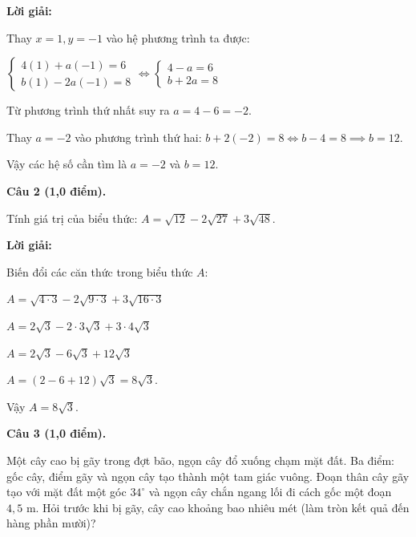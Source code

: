 \documentclass[12pt,a4paper]{article}
\begin{document}
\noindent\textbf{Lời giải:}

Thay $x = 1, y = -1$ vào hệ phương trình ta được:\par $\begin{cases} 4(1) + a(-1) = 6 \\ b(1) - 2a(-1) = 8 \end{cases} \iff \begin{cases} 4 - a = 6 \\ b + 2a = 8 \end{cases}$\par Từ phương trình thứ nhất suy ra $a = 4 - 6 = -2$.\par Thay $a = -2$ vào phương trình thứ hai: $b + 2(-2) = 8 \iff b - 4 = 8 \implies b = 12$.\par Vậy các hệ số cần tìm là $a = -2$ và $b = 12$.

\vspace{3mm}
\noindent\textbf{Câu 2 (1,0 điểm).}

Tính giá trị của biểu thức: $A = \sqrt{12} - 2\sqrt{27} + 3\sqrt{48}$.

\noindent\textbf{Lời giải:}

Biến đổi các căn thức trong biểu thức $A$:\par $A = \sqrt{4 \cdot 3} - 2\sqrt{9 \cdot 3} + 3\sqrt{16 \cdot 3}$\par $A = 2\sqrt{3} - 2 \cdot 3\sqrt{3} + 3 \cdot 4\sqrt{3}$\par $A = 2\sqrt{3} - 6\sqrt{3} + 12\sqrt{3}$\par $A = (2 - 6 + 12)\sqrt{3} = 8\sqrt{3}$.\par Vậy $A = 8\sqrt{3}$.

\vspace{3mm}
\newpage
\noindent\textbf{Câu 3 (1,0 điểm).}

Một cây cao bị gãy trong đợt bão, ngọn cây đổ xuống chạm mặt đất. Ba điểm: gốc cây, điểm gãy và ngọn cây tạo thành một tam giác vuông. Đoạn thân cây gãy tạo với mặt đất một góc $34^\circ$ và ngọn cây chắn ngang lối đi cách gốc một đoạn $4{,}5\text{ m}$. Hỏi trước khi bị gãy, cây cao khoảng bao nhiêu mét (làm tròn kết quả đến hàng phần mười)?
\begin{center}
\end{center}
\end{document}
